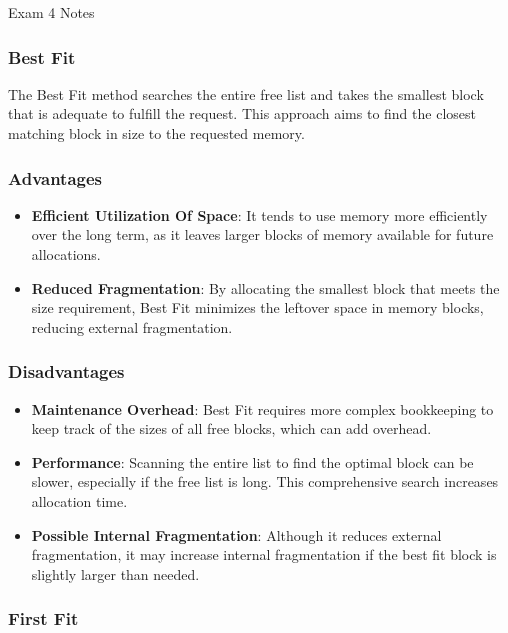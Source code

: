 \begin{examnotes}{Exam 4 Notes}
    \subsubsection*{Best Fit}

    The Best Fit method searches the entire free list and takes the smallest block that is adequate to fulfill the request. This approach aims to find the closest matching block in size to the requested memory.

    \subsubsection*{Advantages}

    \begin{itemize}
        \item \textbf{Efficient Utilization Of Space}: It tends to use memory more efficiently over the long term, as it leaves larger blocks of memory available for future allocations.
        \item \textbf{Reduced Fragmentation}: By allocating the smallest block that meets the size requirement, Best Fit minimizes the leftover space in memory blocks, reducing external fragmentation.
    \end{itemize}

    \subsubsection*{Disadvantages}

    \begin{itemize}
        \item \textbf{Maintenance Overhead}: Best Fit requires more complex bookkeeping to keep track of the sizes of all free blocks, which can add overhead.
        \item \textbf{Performance}: Scanning the entire list to find the optimal block can be slower, especially if the free list is long. This comprehensive search increases allocation time.
        \item \textbf{Possible Internal Fragmentation}: Although it reduces external fragmentation, it may increase internal fragmentation if the best fit block is slightly larger than needed.
    \end{itemize}

    \subsubsection*{First Fit}


\end{examnotes}
